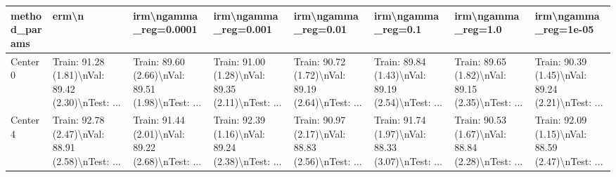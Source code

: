 \begin{tabular}{llllllll}
\toprule
method\_params &                                              erm\textbackslash n &                              irm\textbackslash ngamma\_reg=0.0001 &                               irm\textbackslash ngamma\_reg=0.001 &                                irm\textbackslash ngamma\_reg=0.01 &                                 irm\textbackslash ngamma\_reg=0.1 &                                 irm\textbackslash ngamma\_reg=1.0 &                               irm\textbackslash ngamma\_reg=1e-05 \\
\midrule
Center 0 &  Train: 91.28 (1.81)\textbackslash nVal: 89.42 (2.30)\textbackslash nTest: ... &  Train: 89.60 (2.66)\textbackslash nVal: 89.51 (1.98)\textbackslash nTest: ... &  Train: 91.00 (1.28)\textbackslash nVal: 89.35 (2.11)\textbackslash nTest: ... &  Train: 90.72 (1.72)\textbackslash nVal: 89.19 (2.64)\textbackslash nTest: ... &  Train: 89.84 (1.43)\textbackslash nVal: 89.19 (2.54)\textbackslash nTest: ... &  Train: 89.65 (1.82)\textbackslash nVal: 89.15 (2.35)\textbackslash nTest: ... &  Train: 90.39 (1.45)\textbackslash nVal: 89.24 (2.21)\textbackslash nTest: ... \\
Center 4 &  Train: 92.78 (2.47)\textbackslash nVal: 88.91 (2.58)\textbackslash nTest: ... &  Train: 91.44 (2.01)\textbackslash nVal: 89.22 (2.68)\textbackslash nTest: ... &  Train: 92.39 (1.16)\textbackslash nVal: 89.24 (2.38)\textbackslash nTest: ... &  Train: 90.97 (2.17)\textbackslash nVal: 88.83 (2.56)\textbackslash nTest: ... &  Train: 91.74 (1.97)\textbackslash nVal: 88.33 (3.07)\textbackslash nTest: ... &  Train: 90.53 (1.67)\textbackslash nVal: 88.84 (2.28)\textbackslash nTest: ... &  Train: 92.09 (1.15)\textbackslash nVal: 88.59 (2.47)\textbackslash nTest: ... \\
\bottomrule
\end{tabular}
